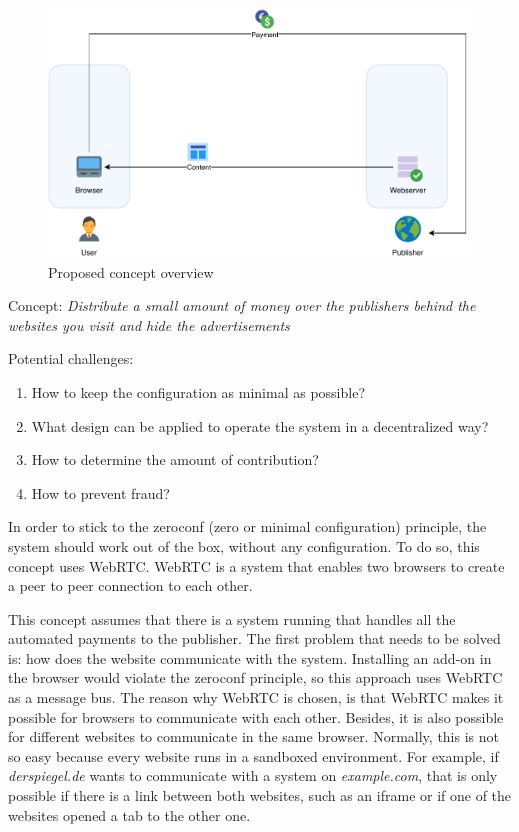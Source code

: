\begin{figure}[h!]
  \center
  \includegraphics[width=12cm]{images/concept.pdf}
  \caption{Proposed concept overview}
\end{figure}
\vspace{2em}

Concept: \textit{Distribute a small amount of money over the publishers behind the websites you visit and hide the advertisements}

\vspace{2em}

Potential challenges:
\begin{enumerate}
  \item How to keep the configuration as minimal as possible?
  \item What design can be applied to operate the system in a decentralized way?
  \item How to determine the amount of contribution?
  \item How to prevent fraud?
\end{enumerate}


In order to stick to the zeroconf (zero or minimal configuration) principle, the system should work out of the box, without any configuration. To do so, this concept uses WebRTC. WebRTC is a system that enables two browsers to create a peer to peer connection to each other.

This concept assumes that there is a system running that handles all the automated payments to the publisher. The first problem that needs to be solved is: how does the website communicate with the system. Installing an add-on in the browser would violate the zeroconf principle, so this approach uses WebRTC as a message bus. The reason why WebRTC is chosen, is that WebRTC makes it possible for browsers to communicate with each other. Besides, it is also possible for different websites to communicate in the same browser. Normally, this is not so easy because every website runs in a sandboxed environment. For example, if \textit{derspiegel.de} wants to communicate with a system on \textit{example.com}, that is only possible if there is a link between both websites, such as an iframe or if one of the websites opened a tab to the other one. 

